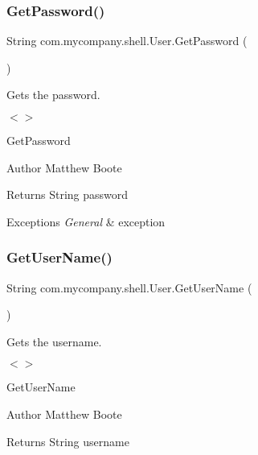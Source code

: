 \subsubsection{\texorpdfstring{Get\+Password()}{GetPassword()}}
{\footnotesize\ttfamily String com.\+mycompany.\+shell.\+User.\+Get\+Password (\begin{DoxyParamCaption}{ }\end{DoxyParamCaption})\hspace{0.3cm}{\ttfamily [inline]}}



Gets the password. 

$<$$>$

Get\+Password

\begin{DoxyAuthor}{Author}
Matthew Boote
\end{DoxyAuthor}
\begin{DoxyReturn}{Returns}
String password
\end{DoxyReturn}

\begin{DoxyExceptions}{Exceptions}
{\em General} & exception \\
\hline
\end{DoxyExceptions}
\mbox{\label{group__TechnicalDetails_ga7a04eb11e9e107366bf95862e5516aec}} 
\subsubsection{\texorpdfstring{Get\+User\+Name()}{GetUserName()}}
{\footnotesize\ttfamily String com.\+mycompany.\+shell.\+User.\+Get\+User\+Name (\begin{DoxyParamCaption}{ }\end{DoxyParamCaption})\hspace{0.3cm}{\ttfamily [inline]}}



Gets the username. 

$<$$>$

Get\+User\+Name

\begin{DoxyAuthor}{Author}
Matthew Boote
\end{DoxyAuthor}
\begin{DoxyReturn}{Returns}
String username
\end{DoxyReturn}

